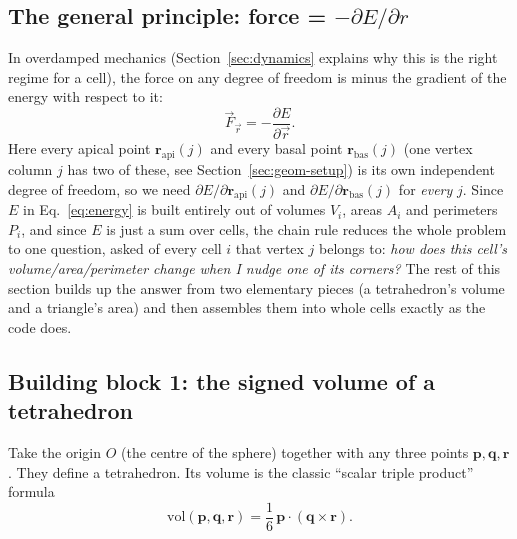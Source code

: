 \documentclass[11pt,a4paper]{report}
\newcommand{\rvec}{\mathbf{r}}
\newcommand{\pvec}{\mathbf{p}}
\newcommand{\qvec}{\mathbf{q}}
\begin{document}
\subsection{The general principle: force = $-\partial E/\partial r$}
In overdamped mechanics (Section~\ref{sec:dynamics} explains why this
is the right regime for a cell), the force on any degree of freedom is
minus the gradient of the energy with respect to it:
\begin{equation}
  \vec F_{\vec r} = -\frac{\partial E}{\partial \vec r} .
  \label{eq:force-def}
\end{equation}
Here every apical point $\rvec_{\mathrm{api}}(j)$ and every basal point
$\rvec_{\mathrm{bas}}(j)$ (one vertex column $j$ has two of these, see
Section~\ref{sec:geom-setup}) is its own independent degree of freedom,
so we need $\partial E/\partial \rvec_{\mathrm{api}}(j)$ and
$\partial E/\partial \rvec_{\mathrm{bas}}(j)$ for \emph{every} $j$.
Since $E$ in Eq.~\ref{eq:energy} is built entirely out of volumes
$V_i$, areas $A_i$ and perimeters $P_i$, and since $E$ is just a sum
over cells, the chain rule reduces the whole problem to one question,
asked of every cell $i$ that vertex $j$ belongs to:
\emph{how does this cell's volume/area/perimeter change when I nudge
one of its corners?} The rest of this section builds up the answer
from two elementary pieces (a tetrahedron's volume and a triangle's
area) and then assembles them into whole cells exactly as the code
does.

\subsection{Building block 1: the signed volume of a tetrahedron}
\label{sec:tetra-vol}
Take the origin $O$ (the centre of the sphere) together with any three
points $\pvec, \qvec, \rvec$. They define a tetrahedron. Its volume is
the classic ``scalar triple product'' formula
\begin{equation}
  \mathrm{vol}(\pvec,\qvec,\rvec) = \frac{1}{6}\,\pvec\cdot(\qvec\times\rvec) .
  \label{eq:tetra-vol}
\end{equation}
\end{document}
